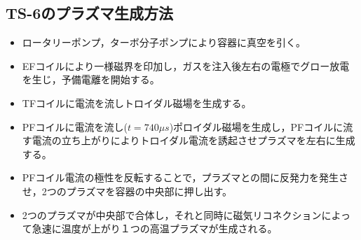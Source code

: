 \subsection{TS-6のプラズマ生成方法}
\begin{itemize}
	\item ロータリーポンプ，ターボ分子ポンプにより容器に真空を引く。
 \item EFコイルにより一様磁界を印加し，ガスを注入後左右の電極でグロー放電を生じ，予備電離を開始する。
 \item TFコイルに電流を流しトロイダル磁場を生成する。
 \item PFコイルに電流を流し($t=740\mu s$)ポロイダル磁場を生成し，PFコイルに流す電流の立ち上がりによりトロイダル電流を誘起させプラズマを左右に生成する。
 \item PFコイル電流の極性を反転することで，プラズマとの間に反発力を発生させ，2つのプラズマを容器の中央部に押し出す。
 \item 2つのプラズマが中央部で合体し，それと同時に磁気リコネクションによって急速に温度が上がり１つの高温プラズマが生成される。
\end{itemize}

